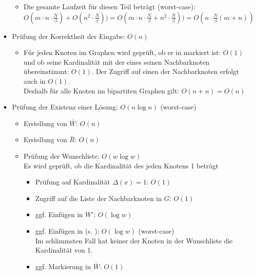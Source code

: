 \begin{itemize}
\begin{itemize}
    \item Die gesamte Laufzeit für diesen Teil beträgt (worst-case):\\
    $O(m \cdot n \cdot\frac{N}{\beta}) + O(n^2 \cdot\frac{N}{\beta})) = 
    O(m \cdot n \cdot\frac{N}{\beta} + n^2 \cdot\frac{N}{\beta})) = O(n\cdot \frac{N}{\beta}(m + n))$ 
    \vspace{9pt}
  \end{itemize}

  \item Prüfung der Korrektheit der Eingabe: $O(n)$
  \begin{itemize}
    \item Für jeden Knoten im Graphen wird geprüft, ob 
    er in  markiert ist: $O(1)$ und ob seine Kardinalität mit der eines seinen
    Nachbarknoten übereinstimmt: $O(1)$. Der Zugriff auf einen der Nachbarknoten erfolgt auch in $O(1)$.\\
    Deshalb für alle Knoten im bipartiten Graphen gilt: $O(n + n) = O(n)$
  \end{itemize}

  \item Prüfung der Existenz einer Lösung: $O(n \log n)$ (worst-case)
  \begin{itemize}
    \item Erstellung von $\bar{W}$: $O(n)$

    \item Erstellung von $\bar{R}$: $O(n)$

    \item Prüfung der Wunschliste: $O(w \log w)$\\
    Es wird geprüft, ob die Kardinalität des jeden Knotens 1 beträgt
    \begin{itemize}
    \item Prüfung auf Kardinalität $\Delta(x) = 1$: $O(1)$
    \item Zugriff auf die Liste der Nachbarknoten in $G$: $O(1)$
    \item ggf. Einfügen in $W'$: $O(\log w)$
    \item ggf. Einfügen in  (s. ): $O(\log w)$ (worst-case)\\
    Im schlimmsten Fall hat keiner der Knoten in der Wunschliste die Kardinalität von 1.
    \item ggf. Markierung in $\bar{W}$: $O(1)$
    \end{itemize}


\end{itemize}
\end{itemize}
